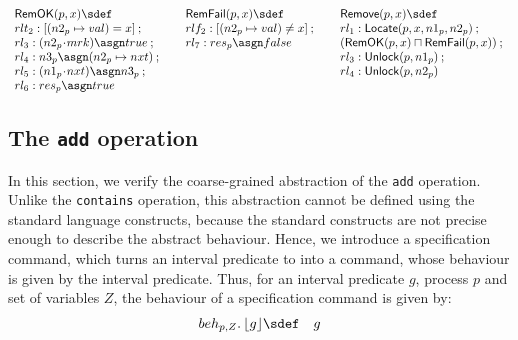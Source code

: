 \documentclass{article}
\def \hasgn{\asgn}
\def\cdota{\!\cdot\!}
\theoremstyle{plain}
\theoremstyle{definition}
\def\ch{\mathbin{;}}
\begin{document}
$$
\begin{array}[t]{l@{\qquad}l@{\qquad}l}
  \begin{array}[t]{@{}l@{}}
    \mathsf{RemOK}(p,x) \sdef \\
    rlt_2: [(n2_p\mapsto val) = x] \ch {} \\
    rl_3: (n2_p \cdota mrk) \hasgn true
    \ch {} \\
    rl_4: n3_p \asgn (n2_p\mapsto nxt) \ch {} \\
    rl_5: (n1_p \cdota nxt) \hasgn n3_p \ch {} \\
    rl_6: res_p \asgn true
  \end{array}
  & 
  \begin{array}[t]{@{}l@{}}
    \mathsf{RemFail}(p,x)  \sdef \\
    rlf_2: [(n2_p\mapsto val) \neq x]
    \ch {} \\
    rl_7: res_p \asgn false
  \end{array}
  & 
  \begin{array}[t]{@{}l@{}}
    \mathsf{Remove}(p,x) \sdef \\
    rl_1: \mathsf{Locate}(p,x, n1_p, n2_p) \ch {} \\
    (\mathsf{RemOK}(p,x)\sqcap \mathsf{RemFail}(p,x)) \ch {} \\
    rl_3: \mathsf{Unlock}(p, n1_p) \ch {} \\
    rl_4: \mathsf{Unlock}(p, n2_p)
  \end{array}
\end{array}
$$

\subsection{The \texttt{add} operation}

In this section, we verify the coarse-grained abstraction of the
\texttt{add} operation.  Unlike the \texttt{contains} operation, this
abstraction cannot be defined using the standard language constructs,
because the standard constructs are not precise enough to describe the
abstract behaviour.  Hence, we introduce a specification command,
which turns an interval predicate to into a command, whose behaviour
is given by the interval predicate. Thus, for an interval predicate
$g$, process $p$ and set of variables $Z$, the behaviour of a
specification command is given by:
\begin{eqnarray*}
  beh_{p,Z}.\spec{g} & \sdef & g
\end{eqnarray*}
\end{document}

